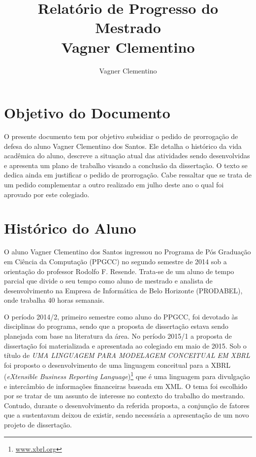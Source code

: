 \documentclass[10pt,a4paper]{report}
\author{Vagner Clementino}
\title{Relatório de Progresso do Mestrado\\
	Vagner Clementino}
\begin{document}
\maketitle

\chapter{Objetivo do Documento}
\label{sec:objetivo}

O presente documento tem por objetivo subsidiar o pedido de prorrogação de
defesa do aluno Vagner Clementino dos Santos. Ele detalha o histórico da vida
acadêmica do aluno, descreve a situação atual das atividades sendo desenvolvidas
e apresenta um plano de trabalho visando a conclusão da dissertação.  O texto se
dedica ainda em justificar o pedido de prorrogação. Cabe ressaltar que se trata
de um pedido complementar a outro realizado em julho deste ano o qual foi
aprovado por este colegiado.

\chapter{Histórico do Aluno}
\label{sec:historico}

O aluno Vagner Clementino dos Santos ingressou no Programa de Pós Graduação em
Ciência da Computação (PPGCC) no segundo semestre de 2014 sob a orientação do
professor Rodolfo F. Resende. Trata-se de um aluno de tempo parcial que divide o
seu tempo como aluno de mestrado e analista de desenvolvimento na Empresa de
Informática de Belo Horizonte (PRODABEL), onde trabalha 40 horas semanais.

O período 2014/2, primeiro semestre como aluno do PPGCC, foi devotado às
disciplinas do programa, sendo que a proposta de dissertação estava sendo
planejada com base na literatura da área. No período 2015/1 a proposta de
dissertação foi materializada e apresentada ao colegiado em maio de 2015. Sob o
título de \textit{UMA LINGUAGEM PARA MODELAGEM CONCEITUAL EM XBRL} foi proposto
o desenvolvimento de uma linguagem conceitual para a XBRL (\textit{eXtensible
	Business Reporting Language})\footnote{\url{www.xbrl.org}} que é uma
linguagem para divulgação e intercâmbio de informações financeiras baseada em
XML\@. O tema foi escolhido por se tratar de um assunto de interesse no contexto
do trabalho do mestrando. Contudo, durante o desenvolvimento da referida
proposta, a conjunção de fatores que a sustentavam deixou de existir, sendo
necessária a apresentação de um novo projeto de dissertação.
\end{document}
